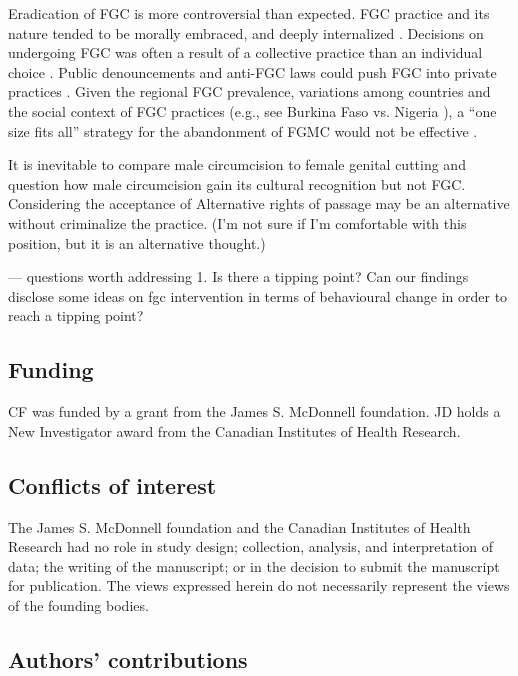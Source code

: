 \documentclass[12pt,]{article}
\begin{document}
Eradication of FGC is more controversial than expected.  FGC practice and its nature tended to be morally embraced, and deeply internalized \cite{SchuLien13}.  Decisions on undergoing FGC was often a result of a collective practice than an individual choice \cite{Dell04, Hayf06, FreyJoh07, KandMwek09, Mack96, Mack06, ShelHern06, ShelWand11, YirgKass12}. Public denouncements and anti-FGC laws could push FGC into private practices \cite{GaluKama15, VanCoen17}.  Given the regional FGC prevalence, variations among countries and the social context of FGC practices (e.g., see Burkina Faso \cite{KarmKand11} vs. Nigeria \cite{KandNwak09}), a “one size fits all” strategy for the abandonment of FGMC would not be effective \cite{JohaDiop13, YodeWang13}.

It is inevitable to compare male circumcision to female genital cutting and question how male circumcision gain its cultural recognition but not FGC.  Considering the acceptance of Alternative rights of passage \cite{GaluKama15} may be an alternative without criminalize the practice. (I'm not sure if I'm comfortable with this position, but it is an alternative thought.)

--- questions worth addressing
1. Is there a tipping point?  Can our findings disclose some ideas on fgc intervention in terms of behavioural change in order to reach a tipping point?
\subsection{Funding}\label{Funding}

CF was funded by a grant from the James S. McDonnell foundation. JD holds a New Investigator award from the Canadian Institutes of Health Research.

\subsection{Conflicts of interest}\label{Conflicts-of-Interest}

The James S. McDonnell foundation and the Canadian Institutes of Health Research had no role in study design; collection, analysis, and interpretation of data; the writing of the manuscript; or in the decision to submit the manuscript for publication.  The views expressed herein do not necessarily represent the views of the founding bodies.

\subsection{Authors' contributions}\label{Authors'-contributions}
\end{document}
